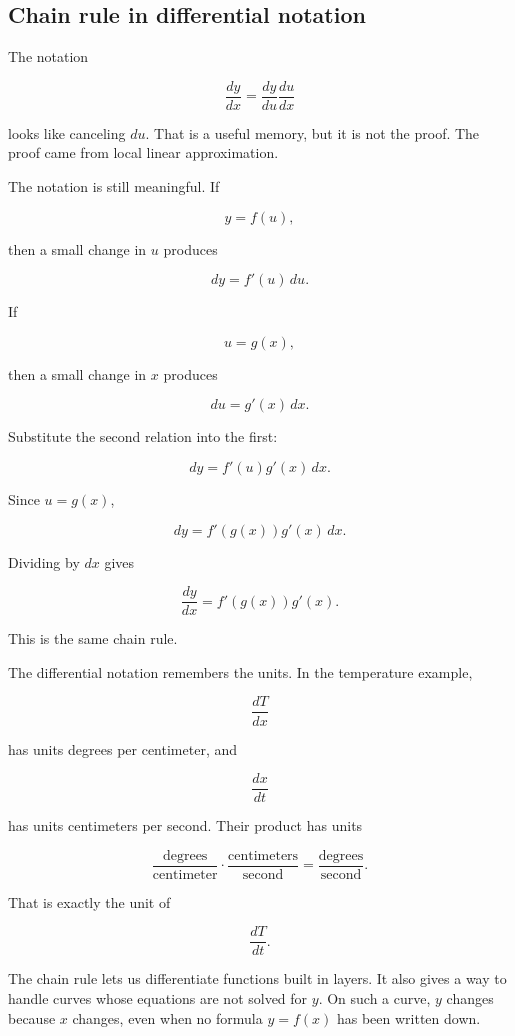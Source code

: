 \subsection{Chain rule in differential notation}
\label{subsec:chain-rule-differential-notation}

The notation

\[
\frac{dy}{dx}
=
\frac{dy}{du}\frac{du}{dx}
\]

looks like canceling \(du\).  That is a useful memory, but it is not the proof.  The proof came from local linear approximation.

The notation is still meaningful.  If

\[
y=f(u),
\]

then a small change in \(u\) produces

\[
dy=f'(u)\,du.
\]

If

\[
u=g(x),
\]

then a small change in \(x\) produces

\[
du=g'(x)\,dx.
\]

Substitute the second relation into the first:

\[
dy=f'(u)g'(x)\,dx.
\]

Since \(u=g(x)\),

\[
dy=f'(g(x))g'(x)\,dx.
\]

Dividing by \(dx\) gives

\[
\frac{dy}{dx}=f'(g(x))g'(x).
\]

This is the same chain rule.

The differential notation remembers the units.  In the temperature example,

\[
\frac{dT}{dx}
\]

has units degrees per centimeter, and

\[
\frac{dx}{dt}
\]

has units centimeters per second.  Their product has units

\[
\frac{\text{degrees}}{\text{centimeter}}
\cdot
\frac{\text{centimeters}}{\text{second}}
=
\frac{\text{degrees}}{\text{second}}.
\]

That is exactly the unit of

\[
\frac{dT}{dt}.
\]

The chain rule lets us differentiate functions built in layers.  It also gives a way to handle curves whose equations are not solved for \(y\).  On such a curve, \(y\) changes because \(x\) changes, even when no formula \(y=f(x)\) has been written down.

